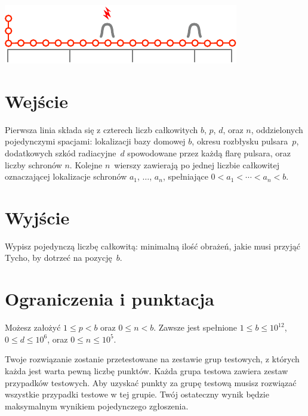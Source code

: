 \includegraphics[width=.4\textwidth]{img/sample3.pdf}

\section*{Wejście}

Pierwsza linia składa się z czterech liczb całkowitych $b$, $p$, $d$, oraz $n$, oddzielonych pojedynczymi spacjami:
lokalizacji bazy domowej $b$,
okresu rozbłysku pulsara~$p$,
dodatkowych szkód radiacyjne~$d$ spowodowane przez każdą flarę pulsara,
oraz liczby schronów $n$.
Kolejne $n$~wierszy zawierają po jednej liczbie całkowitej oznaczającej lokalizacje schronów $a_1$, $\ldots$, $a_n$, spełniające
$0<a_1<\cdots <a_n< b$. %

\section*{Wyjście}

Wypisz pojedynczą liczbę całkowitą: minimalną ilość obrażeń, jakie musi przyjąć Tycho, by dotrzeć na pozycję~$b$.

\section*{Ograniczenia i punktacja}

Możesz założyć
$1\leq p < b$ %
oraz
$0\leq n < b$. %
Zawsze jest spełnione
$1\leq b\leq 10^{12}$, %
$0\leq d \leq 10^6$, %
oraz
$0\leq n \leq 10^5$. %

Twoje rozwiązanie zostanie przetestowane na zestawie grup testowych, z których każda jest warta pewną liczbę punktów.
Każda grupa testowa zawiera zestaw przypadków testowych.
Aby uzyskać punkty za grupę testową musisz rozwiązać wszystkie przypadki testowe w tej grupie.
Twój ostateczny wynik będzie maksymalnym wynikiem pojedynczego zgłoszenia.


